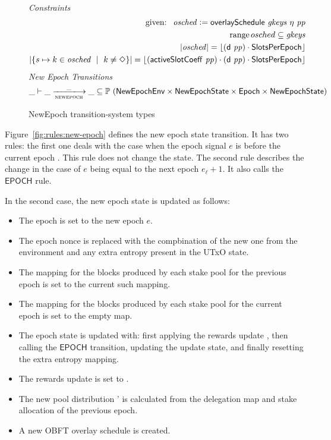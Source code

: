 \begin{figure}
\begin{align*}
  \end{align*}
  \emph{Constraints}
  \begin{align*}
    \text{ given: }~\mathit{osched}\mathrel{\mathop:}=\mathsf{overlaySchedule}~\mathit{gkeys}~{\eta}~\mathit{pp} \\
    \operatorname{range}{osched}\subseteq\mathit{gkeys} \\
    |\mathit{osched}| = \lfloor(\mathsf{d}~\mathit{pp})\cdot\mathsf{SlotsPerEpoch}\rfloor \\
    |\{s\mapsto k\in\mathit{osched}~\mid~k\neq\Diamond\}| =
    \lfloor(\mathsf{activeSlotCoeff}~ \mathit{pp})\cdot(\mathsf{d}~\mathit{pp})\cdot\mathsf{SlotsPerEpoch}\rfloor \\
  \end{align*}
  \emph{New Epoch Transitions}
  \begin{equation*}
    \_ \vdash \var{\_} \trans{newepoch}{\_} \var{\_} \subseteq
    \powerset (\NewEpochEnv \times \NewEpochState \times \Epoch \times \NewEpochState)
  \end{equation*}
  \caption{NewEpoch transition-system types}
  \label{fig:ts-types:newepoch}
\end{figure}

Figure~\ref{fig:rules:new-epoch} defines the new epoch state transition. It
has two rules: the first one deals with the case when the epoch signal $e$ is before the
current epoch . This rule does not change the state. The second rule
describes the change in the case of $e$ being equal to the next epoch
$e_\ell+ 1$. It also calls the $\mathsf{EPOCH}$ rule.

In the second case, the new epoch state is updated as follows:

\begin{itemize}
\item The epoch is set to the new epoch $e$.
\item The epoch nonce is replaced with the compbination of the new one from the
  environment and any extra entropy present in the UTxO state.
\item The mapping for the blocks produced by each stake pool for the previous epoch
  is set to the current such mapping.
\item The mapping for the blocks produced by each stake pool for the current epoch
  is set to the empty map.
\item The epoch state is updated with: first applying the rewards update ,
  then calling the $\mathsf{EPOCH}$ transition, updating the update state, and finally
  resetting the extra entropy mapping.
\item The rewards update is set to \Nothing.
\item The new pool distribution ' is calculated from the delegation map and
  stake allocation of the previous epoch.
\item A new OBFT overlay schedule is created.
\end{itemize}

